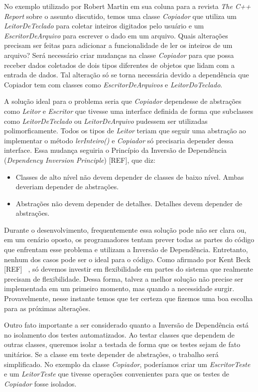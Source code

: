 No exemplo utilizado por Robert Martin em sua coluna para a revista \textit{The C++ Report}
sobre o assunto discutido, temos uma classe  \textit{Copiador} que utiliza um \textit{LeitorDeTeclado} para coletar inteiros digitados pelo usuário e um  \textit{EscritorDeArquivo} para escrever o dado em um arquivo. Quais alterações precisam ser feitas  para adicionar a funcionalidade de ler os inteiros de um arquivo? Será necessário criar mudanças na classe  \textit{Copiador} para que possa receber dados coletados de dois tipos diferentes de objetos que lidam com a entrada de dados. Tal alteração só se torna necessária devido a dependência que Copiador tem com classes como \textit{EscritorDeArquivos} e \textit{LeitorDoTeclado}.
	
A solução ideal para o problema seria que  \textit{Copiador} dependesse de abstrações como \textit{Leitor} e  \textit{Escritor} que tivesse uma interface definida de forma que subclasses como  \textit{LeitorDeTeclado} ou  \textit{LeitorDeArquivo} pudessem ser utilizadas polimorficamente. Todos os tipos de  \textit{Leitor} teriam que seguir uma abstração ao implementar o método  \textit{lerInteiro()} e  \textit{Copiador} só precisaria depender dessa interface. Essa mudança seguiria o Princípio da Inversão de Dependência (\textit{Dependency Inversion Principle}) [REF], que diz:
	
\begin{itemize}
 	\item Classes de alto nível não devem depender de classes de baixo nível. Ambas deveriam depender de abstrações.
	\item Abstrações não devem depender de detalhes. Detalhes devem depender de abstrações.
\end{itemize}

Durante o desenvolvimento, frequentemente essa solução pode não ser clara ou, em um cenário oposto, os programadores tentam prever todas as partes do código que enfrentam esse problema e utilizam a Inversão de Dependência. Entretanto, nenhum dos casos pode ser o ideal para o código. Como afirmado por Kent Beck [REF] ~\citep{}, só devemos investir em flexibilidade em partes do sistema que realmente precisam de flexibilidade. Dessa forma, talvez a melhor solução não precise ser implementada em um primeiro momento, mas quando a necessidade surgir. Provavelmente, nesse instante temos que ter certeza que fizemos uma boa escolha para as próximas alterações.

Outro fato importante a ser considerado quanto a Inversão de Dependência está no isolamento dos testes automatizados. Ao testar classes que dependem de outras classes, queremos isolar a testada de forma que os testes sejam de fato unitários. Se a classe em teste depender de abstrações, o trabalho será simplificado. No exemplo da classe \textit{Copiador}, poderíamos criar um \textit{EscritorTeste} e um \textit{LeitorTeste} que tivesse operações convenientes para que os testes de \textit{Copiador} fosse isolados.


